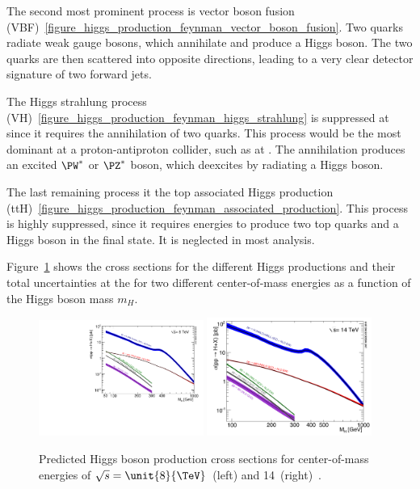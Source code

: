 The second most prominent process is vector boson fusion (VBF)~\ref{figure_higgs_production_feynman_vector_boson_fusion}.
Two quarks radiate weak gauge bosons, which annihilate and produce a Higgs boson. The two quarks are then scattered into opposite
directions, leading to a very clear detector signature of two forward jets.

The Higgs strahlung process (VH)~\ref{figure_higgs_production_feynman_higgs_strahlung} is suppressed at \LHC since it requires the
annihilation of two quarks. This process would be the most dominant at a proton-antiproton collider, such as \Tevatron at \Fermilab.
The annihilation produces an excited $\PW^*$ or $\PZ^*$ boson, which deexcites by radiating a Higgs boson.

The last remaining process it the top associated Higgs production (ttH)~\ref{figure_higgs_production_feynman_associated_production}.
This process is highly suppressed, since it requires energies to produce two top quarks and a Higgs boson in the final state. It is
neglected in most analysis.

Figure~\ref{figure_higgs_production_cross_sections} shows the cross sections for the different Higgs productions and their total uncertainties
at the \LHC for two different center-of-mass energies as a function of the Higgs boson mass $m_H$.


\begin{figure}[h]
\includegraphics[width=0.48\textwidth]{figures/Higgs_XS_8TeV_lx.pdf}
\hfill
\includegraphics[width=0.48\textwidth]{figures/YRHXS_Summary_fig3}
\caption[Higgs boson production cross sections.]{Predicted Higgs boson production cross sections for center-of-mass energies of $\sqrt s=\unit{8}{\TeV}$~(left) and \unit{14}{\TeV}~(right)~\cite{yellow_report_1, yellow_report_2, yellow_report_3}.}
\label{figure_higgs_production_cross_sections}
\end{figure}

